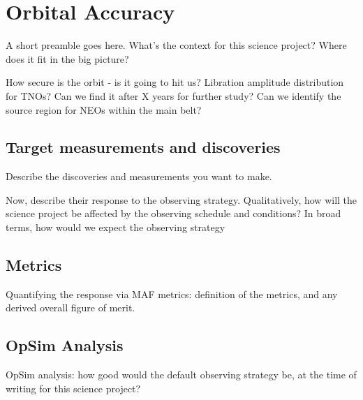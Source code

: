 
\section{Orbital Accuracy}
\def\secname{\chpname:orbits}\label{sec:\secname}


A short preamble goes here. What's the context for this science
project? Where does it fit in the big picture?

How secure is the orbit - is it going to hit us?
Libration amplitude distribution for TNOs?
Can we find it after X years for further study?
Can we identify the source region for NEOs within the main belt?


\subsection{Target measurements and discoveries}
\label{sec:\secname:targets}

Describe the discoveries and measurements you want to make.

Now, describe their response to the observing strategy. Qualitatively,
how will the science project be affected by the observing schedule and
conditions? In broad terms, how would we expect the observing strategy




\subsection{Metrics}
\label{sec:\secname:metrics}

Quantifying the response via MAF metrics: definition of the metrics,
and any derived overall figure of merit.



\subsection{OpSim Analysis}
\label{sec:\secname:analysis}

OpSim analysis: how good would the default observing strategy be, at
the time of writing for this science project?


